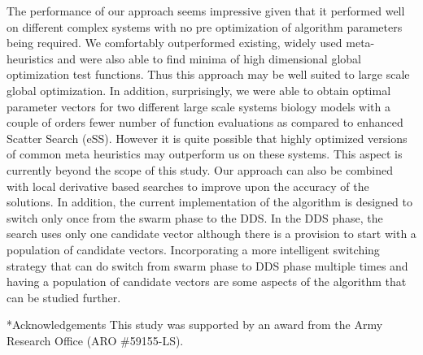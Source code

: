 \documentclass[12pt]{article}
\makeatletter
\renewcommand\section{\@startsection
	{subsection}{2}{0mm}
	{-0.2in}
	{0.05\baselineskip}
	{\normalfont\large\bfseries}}
\makeatother
\begin{document}
The performance of our approach seems impressive given that it performed well on different complex systems with no pre optimization of algorithm parameters being required. We comfortably outperformed existing, widely used meta-heuristics and were also able to find minima of high dimensional global optimization test functions. Thus this approach may be well suited to large scale global optimization. In addition, surprisingly, we were able to obtain optimal parameter vectors for two different large scale systems biology models with a couple of orders fewer number of function evaluations as compared to enhanced Scatter Search (eSS). However it is quite possible that highly optimized versions of common meta heuristics may outperform us on these systems. This aspect is currently beyond the scope of this study. Our approach can also be combined with local derivative based searches to improve upon the accuracy of the solutions. In addition, the current implementation of the algorithm is designed to switch only once from the swarm phase to the DDS. In the DDS phase, the search uses only one candidate vector although there is a provision to start with a population of candidate vectors. Incorporating a more intelligent switching strategy that can do switch from swarm phase to DDS phase multiple times and having a population of candidate vectors are some aspects of the algorithm that can be studied further.


\section*{Acknowledgements}
This study was supported by an award from the Army Research Office (ARO \#59155-LS).
\clearpage




\clearpage
\end{document}
